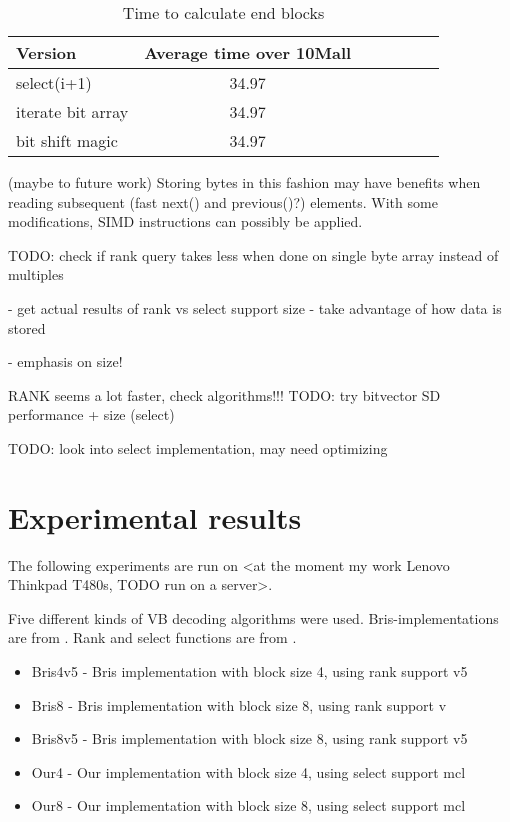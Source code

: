 \begin{table}
\centering
\caption{Time to calculate end blocks}
\begin{tabular}{l||c c c c c c} 
Version & Average time over 10Mall \\ 
\hline \hline 
select(i+1) & 34.97 \\
iterate bit array & 34.97 \\
bit shift magic & 34.97 \\
\hline
%
\end{tabular}
\label{endblockcall}
\end{table}

(maybe to future work) Storing bytes in this fashion may have benefits when reading subsequent (fast next() and previous()?) elements. With some modifications, SIMD instructions can possibly be applied.



TODO: check if rank query takes less when done on single byte array instead of multiples

 - get actual results of rank vs select support size
 - take advantage of how data is stored

 - emphasis on size!

     RANK seems a lot faster, check algorithms!!!
TODO: try bitvector SD performance + size (select)

TODO: look into select implementation, may need optimizing

\chapter{Experimental results}

The following experiments are run on <at the moment my work Lenovo Thinkpad T480s, TODO run on a server>.

Five different kinds of VB decoding algorithms were used. Bris-implementations are from \citep{Bri09}. Rank and select functions are from
 \citep{gbmp2014sea}.

\begin{itemize}
  \item Bris4v5 - Bris implementation with block size 4, using rank support v5
  \item Bris8 - Bris implementation with block size 8, using rank support v
  \item Bris8v5 - Bris implementation with block size 8, using rank support v5
  \item Our4 - Our implementation with block size 4, using select support mcl
  \item Our8 - Our implementation with block size 8, using select support mcl
\end{itemize}

